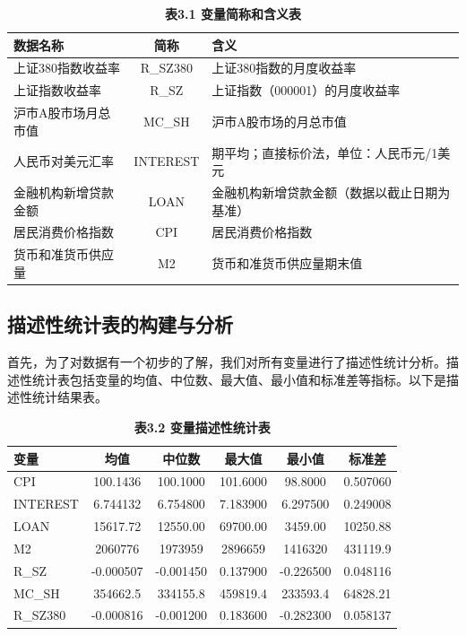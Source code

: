 \documentclass[12pt, a4paper]{article}
\numberwithin{equation}{section}
\begin{document}
\begin{table}[h!]
    \centering
    \captionsetup{labelformat=empty}
    \caption{\textbf{\fontsize{9pt}{11pt}\selectfont 表3.1 变量简称和含义表}}
    \begin{tabular}{lcl}
        \toprule
        数据名称       & 简称       & 含义                     \\
        \midrule
        上证380指数收益率 & R\_SZ380 & 上证380指数的月度收益率          \\
        上证指数收益率    & R\_SZ    & 上证指数（000001）的月度收益率     \\
        沪市A股市场月总市值 & MC\_SH   & 沪市A股市场的月总市值            \\
        人民币对美元汇率   & INTEREST & 期平均；直接标价法，单位：人民币元/1美元  \\
        金融机构新增贷款金额 & LOAN     & 金融机构新增贷款金额（数据以截止日期为基准） \\
        居民消费价格指数   & CPI      & 居民消费价格指数               \\
        货币和准货币供应量  & M2       & 货币和准货币供应量期末值           \\
        \bottomrule
    \end{tabular}
\end{table}


\subsection{描述性统计表的构建与分析}
首先，为了对数据有一个初步的了解，我们对所有变量进行了描述性统计分析。描述性统计表包括变量的均值、中位数、最大值、最小值和标准差等指标。以下是描述性统计结果表。

\begin{table}[h!]
    \centering
    \captionsetup{labelformat=empty}
    \caption{\textbf{\fontsize{9pt}{11pt}\selectfont 表3.2 变量描述性统计表}}
    \begin{tabular}{lccccc}
        \toprule
        变量       & 均值        & 中位数       & 最大值      & 最小值       & 标准差      \\
        \midrule
        CPI      & 100.1436  & 100.1000  & 101.6000 & 98.8000   & 0.507060 \\
        INTEREST & 6.744132  & 6.754800  & 7.183900 & 6.297500  & 0.249008 \\
        LOAN     & 15617.72  & 12550.00  & 69700.00 & 3459.00   & 10250.88 \\
        M2       & 2060776   & 1973959   & 2896659  & 1416320   & 431119.9 \\
        R\_SZ    & -0.000507 & -0.001450 & 0.137900 & -0.226500 & 0.048116 \\
        MC\_SH   & 354662.5  & 334155.8  & 459819.4 & 233593.4  & 64828.21 \\
        R\_SZ380 & -0.000816 & -0.001200 & 0.183600 & -0.282300 & 0.058137 \\
        \bottomrule
    \end{tabular}
\end{table}
\end{document}
